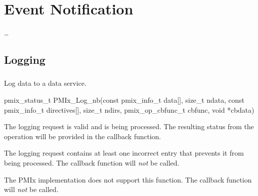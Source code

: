 \chapter{Event Notification}
\label{chap:api_event}

\ldots


\section{Logging}
\label{chap:api_event:logging}


\subsection{}

\summary

Log data to a data service.

\format

\cspecificstart
\begin{codepar}
pmix_status_t
PMIx_Log_nb(const pmix_info_t data[], size_t ndata,
            const pmix_info_t directives[], size_t ndirs,
            pmix_op_cbfunc_t cbfunc, void *cbdata)
\end{codepar}
\cspecificend

\begin{arglist}
\end{arglist}

\begin{constantdesc}
\item {} The logging request is valid and is being processed. The resulting status from the operation will be provided in the callback function.
\item {} The logging request contains at least one incorrect entry that prevents it from being processed. The callback function will \emph{not} be called.
\item {} The \ac{PMIx} implementation does not support this function. The callback function will \emph{not} be called.
\end{constantdesc}


